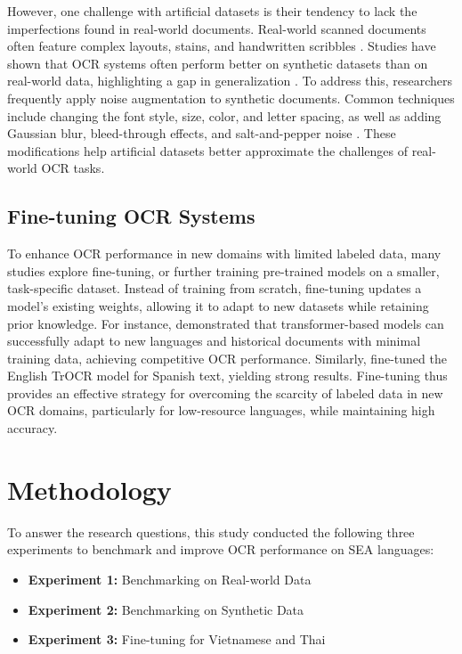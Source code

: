 \documentclass[12pt,oneside]{memoir}
\begin{document}
However, one challenge with artificial datasets is their tendency to lack the imperfections found in real-world documents. 
Real-world scanned documents often feature complex layouts, stains, and handwritten scribbles \parencite{hegghammer-2022}. 
Studies have shown that OCR systems often perform better on synthetic datasets than on real-world data, highlighting a gap in generalization \parencite{ignat-etal-2022}.
To address this, researchers frequently apply noise augmentation to synthetic documents. 
Common techniques include changing the font style, size, color, and letter spacing, as well as adding Gaussian blur, bleed-through effects, and salt-and-pepper noise \parencite{gupte-etal-2021, ignat-etal-2022}.
These modifications help artificial datasets better approximate the challenges of real-world OCR tasks.

\section{Fine-tuning OCR Systems}

To enhance OCR performance in new domains with limited labeled data, many studies explore fine-tuning, or further training pre-trained models on a smaller, task-specific dataset. 
Instead of training from scratch, fine-tuning updates a model's existing weights, allowing it to adapt to new datasets while retaining prior knowledge. 
For instance, \textcite{parres-and-paredes-2023} demonstrated that transformer-based models can successfully adapt to new languages and historical documents with minimal training data, achieving competitive OCR performance. 
Similarly, \textcite{laurent-and-lauar-2024} fine-tuned the English TrOCR model for Spanish text, yielding strong results.
Fine-tuning thus provides an effective strategy for overcoming the scarcity of labeled data in new OCR domains, particularly for low-resource languages, while maintaining high accuracy.


\chapter{Methodology}

To answer the research questions, this study conducted the following three experiments to benchmark and improve OCR performance on SEA languages:

\begin{itemize}
    \item \textbf{Experiment 1:} Benchmarking on Real-world Data
    \item \textbf{Experiment 2:} Benchmarking on Synthetic Data
    \item \textbf{Experiment 3:} Fine-tuning for Vietnamese and Thai
\end{itemize}
\end{document}
